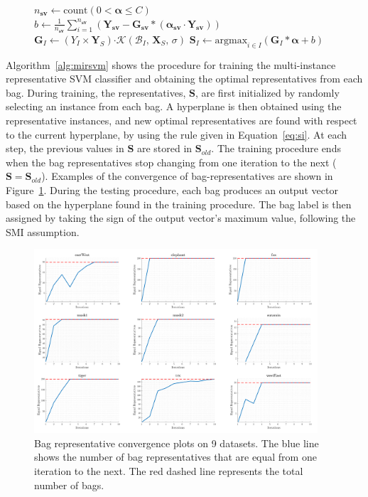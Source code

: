 \documentclass[reqno]{vcuthesis}
\newcommand{\set}[1]{{\left\{#1\right\}}}
\newcommand\tab[1][1cm]{\hspace*{#1}}
\numberwithin{equation}{chapter}
\begin{document}
\begin{figure}[b!]
\begin{minipage}{\textwidth}
\begin{algorithm}[H]
\begin{algorithmic}[1]
\State $n_{\bm{sv}} \leftarrow \text{count}\left(0 < \bm \alpha \leq C \right)$ 
\State $b \leftarrow \frac{1}{n_{\bm{sv}}}\sum_{i=1}^{n_{\bm{sv}}} \left(\bm Y_{\bm{sv}} - \bm G_{\bm{sv}}*\left(\bm{\alpha_{\bm{sv}}} \cdot \bm Y_{\bm{sv}}\right)\right)$ 
\For {$I \in \set{1,\ldots,n}$} 
\State $\bm G_I \leftarrow (Y_I \times \bm Y_S) \bm \cdot \mathcal{K}\left( \mathcal{B}_I,\,\bm X_S,\,\sigma\right)$
\State $\bm S_I \leftarrow \text{argmax}_{i \in I}\left(\bm G_I*\bm{\alpha} + b \right)$ \tab\tab[0.62cm]
\EndFor
\EndWhile 
\end{algorithmic}
\end{algorithm}
\end{minipage}
\end{figure}

Algorithm~\ref{alg:mirsvm} shows the procedure for training the multi-instance representative SVM classifier and obtaining the optimal representatives from each bag.  During training, the representatives, $\bm S$, are first initialized by randomly selecting an instance from each bag. A hyperplane is then obtained using the representative instances, and new optimal representatives are found with respect to the current hyperplane, by using the rule given in Equation~\eqref{eq:si}. At each step, the previous values in $\bm S$ are stored in $\bm S_{old}$. The training procedure ends when the bag representatives stop changing from one iteration to the next ($\bm S = \bm S_{old}$). Examples of the convergence of bag-representatives are shown in Figure~\ref{fig:convegence}. During the testing procedure, each bag produces an output vector based on the hyperplane found in the training procedure. The bag label is then assigned by taking the sign of the output vector's maximum value, following the SMI assumption. 

\begin{figure}[t!]
\centering
\includegraphics[width=0.94\textwidth]{figures/convergence.png} 
\caption{Bag representative convergence plots on 9 datasets. The blue line shows the number of bag representatives that are equal from one iteration to the next. The red dashed line represents the total number of bags.}\label{fig:convegence}
\end{figure}
\end{document}
